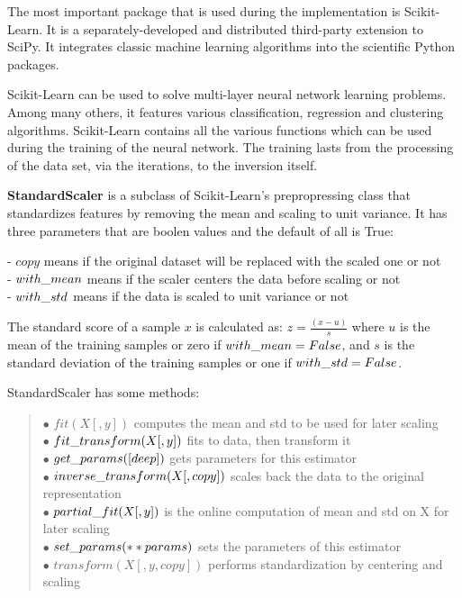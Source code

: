 The most important package that is used during the implementation is Scikit-Learn. It is a separately-developed and distributed third-party extension to SciPy. It integrates classic machine learning algorithms into the scientific Python packages. \smallskip

Scikit-Learn can be used to solve multi-layer neural network learning problems. Among many others, it features various classification, regression and clustering algorithms. Scikit-Learn contains all the various functions which can be used during the training of the neural network. The training lasts from the processing of the data set, via the iterations, to the inversion itself. \bigskip

\textbf{StandardScaler} is a subclass of Scikit-Learn's prepropressing class that standardizes features by removing the mean and scaling to unit variance. It has three parameters that are boolen values and the default of all is True: \smallskip

\noindent - $copy$ means if the original dataset will be replaced with the scaled one or not\\
- $with\char`_mean$ means if the scaler centers the data before scaling or not\\
- $with\char`_std$ means if the data is scaled to unit variance or not \medskip

The standard score of a sample $x$ is calculated as: $z = \frac{(x - u)}{s}$ where $u$ is the mean of the training samples or zero if $with\char`_mean=False$, and $s$ is the standard deviation of the training samples or one if $with\char`_std=False$. \medskip

\noindent StandardScaler has some methods:
\begin{verse}
	$\bullet$ $fit(X[, y])$ computes the mean and std to be used for later scaling\\
	$\bullet$ $fit\char`_transform(X[, y])$ fits to data, then transform it\\
	$\bullet$ $get\char`_params([deep])$ gets parameters for this estimator\\
	$\bullet$ $inverse\char`_transform(X[, copy])$ scales back the data to the original representation\\
	$\bullet$ $partial\char`_fit(X[, y])$ is the online computation of mean and std on X for later scaling\\
	$\bullet$ $set\char`_params(**params)$ sets the parameters of this estimator\\
	$\bullet$ $transform(X[, y, copy])$ performs standardization by centering and scaling
\end{verse}

